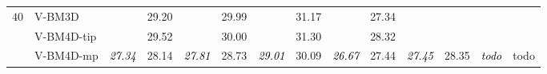 \documentclass[10pt, journal, twocolumn, final, a4paper]{IEEEtran}
\newcommand{\best}[1]{#1}
\newcommand{\bsic}[1]{\textcolor{black}{\textit{#1}}}
\newcommand{\Bsic}[1]{\textcolor{black}{\textbf{\textit{#1}}}}
\newcommand{\Best}[1]{\textbf{\textcolor{black}{#1}}}
\begin{document}
\begin{table}[htp!]
\begin{center}
{\begin{tabular}{ c | l |c c | c c | c c | c c | c c | c c}
			\multirow{1}{*}{$40$}
			                      & V-BM3D               & \bsic{     } &       29.20  & \bsic{     } & \best{29.99} & \bsic{     } &       31.17  & \bsic{     } &       27.34  & \bsic{     } &              & \bsic{     } &              \\
			                      & V-BM4D-tip           & \bsic{     } & \best{29.52} & \bsic{     } & \best{30.00} & \bsic{     } & \best{31.30} & \bsic{     } &       28.32  & \bsic{     } &              & \bsic{     } &              \\
			                      & V-BM4D-mp            & \bsic{27.34} &       28.14  & \bsic{27.81} &       28.73  & \bsic{29.01} &       30.09  & \bsic{26.67} &       27.44  & \bsic{27.45} &       28.35  & \bsic{todo } &       todo   \\

\end{tabular}}
\end{center}
\end{table}
\end{document}
